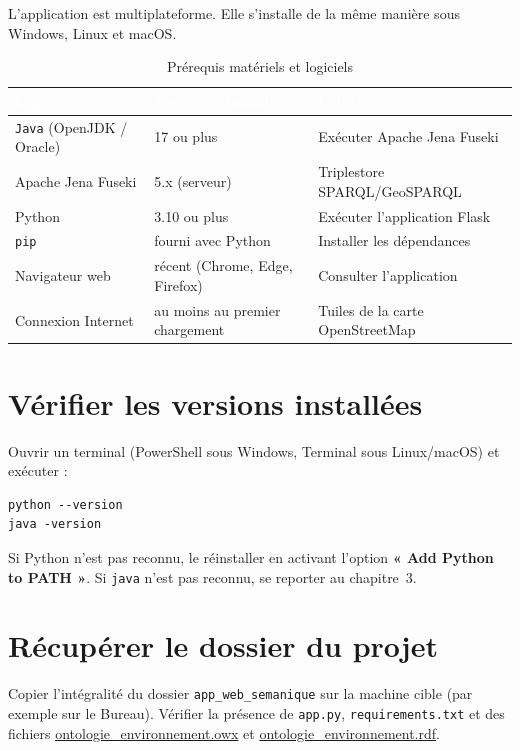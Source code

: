 ﻿\documentclass[12pt,a4paper]{report}
\newcommand{\tete}[1]{\cellcolor{bleu}\textcolor{white}{\bfseries #1}}
\begin{document}
L'application est multiplateforme. Elle s'installe de la même manière sous Windows, Linux et macOS.

\begin{table}[H]
\centering
\caption{Prérequis matériels et logiciels}
\begin{tabular}{@{}p{4.0cm}p{5.8cm}p{4.8cm}@{}}
\hline
\tete{Logiciel} & \tete{Version minimale} & \tete{Utilité} \\
\hline
\rowcolor{grisfond} \texttt{Java} (OpenJDK / Oracle) & 17 ou plus & Exécuter Apache Jena Fuseki \\
\rowcolor{grisfond} Apache Jena Fuseki & 5.x (serveur) & Triplestore SPARQL/GeoSPARQL \\
\rowcolor{grisfond} Python & 3.10 ou plus & Exécuter l'application Flask \\
\rowcolor{grisfond} \texttt{pip} & fourni avec Python & Installer les dépendances \\
\rowcolor{grisfond} Navigateur web & récent (Chrome, Edge, Firefox) & Consulter l'application \\
\rowcolor{grisfond} Connexion Internet & au moins au premier chargement & Tuiles de la carte OpenStreetMap \\
\hline
\end{tabular}
\end{table}

\section{Vérifier les versions installées}

Ouvrir un terminal (PowerShell sous Windows, Terminal sous Linux/macOS) et exécuter :

\begin{lstlisting}
python --version
java -version
\end{lstlisting}

Si Python n'est pas reconnu, le réinstaller en activant l'option
\textbf{« Add Python to PATH »}. Si \texttt{java} n'est pas reconnu, se reporter au chapitre~3.

\section{Récupérer le dossier du projet}

Copier l'intégralité du dossier \texttt{app\_web\_semanique} sur la machine cible
(par exemple sur le Bureau). Vérifier la présence de \texttt{app.py},
\texttt{requirements.txt} et des fichiers \url{ontologie_environnement.owx} et
\url{ontologie_environnement.rdf}.
\end{document}
